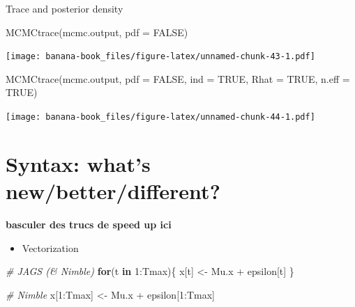 \documentclass[
  12pt,
]{krantz}
\newenvironment{Shaded}{\begin{snugshade}}{\end{snugshade}}
\newcommand{\AttributeTok}[1]{\textcolor[rgb]{0.77,0.63,0.00}{#1}}
\newcommand{\CommentTok}[1]{\textcolor[rgb]{0.56,0.35,0.01}{\textit{#1}}}
\newcommand{\ConstantTok}[1]{\textcolor[rgb]{0.00,0.00,0.00}{#1}}
\newcommand{\ControlFlowTok}[1]{\textcolor[rgb]{0.13,0.29,0.53}{\textbf{#1}}}
\newcommand{\DecValTok}[1]{\textcolor[rgb]{0.00,0.00,0.81}{#1}}
\newcommand{\FunctionTok}[1]{\textcolor[rgb]{0.00,0.00,0.00}{#1}}
\newcommand{\NormalTok}[1]{#1}
\newcommand{\OtherTok}[1]{\textcolor[rgb]{0.56,0.35,0.01}{#1}}
\newcommand{\SpecialCharTok}[1]{\textcolor[rgb]{0.00,0.00,0.00}{#1}}
\providecommand{\tightlist}{%
  \setlength{\itemsep}{0pt}\setlength{\parskip}{0pt}}
\begin{document}
Trace and posterior density

\begin{Shaded}
\begin{Highlighting}[]
\FunctionTok{MCMCtrace}\NormalTok{(mcmc.output,}
          \AttributeTok{pdf =} \ConstantTok{FALSE}\NormalTok{)}
\end{Highlighting}
\end{Shaded}

\texttt{[image: banana-book\_files/figure-latex/unnamed-chunk-43-1.pdf]}

\begin{Shaded}
\begin{Highlighting}[]
\FunctionTok{MCMCtrace}\NormalTok{(mcmc.output,}
          \AttributeTok{pdf =} \ConstantTok{FALSE}\NormalTok{,}
          \AttributeTok{ind =} \ConstantTok{TRUE}\NormalTok{,}
          \AttributeTok{Rhat =} \ConstantTok{TRUE}\NormalTok{,}
          \AttributeTok{n.eff =} \ConstantTok{TRUE}\NormalTok{)}
\end{Highlighting}
\end{Shaded}

\texttt{[image: banana-book\_files/figure-latex/unnamed-chunk-44-1.pdf]}

\hypertarget{syntax-whats-newbetterdifferent}{%
\section{Syntax: what's new/better/different?}\label{syntax-whats-newbetterdifferent}}

\textbf{basculer des trucs de speed up ici}

\begin{itemize}
\tightlist
\item
  Vectorization
\end{itemize}

\begin{Shaded}
\begin{Highlighting}[]
\CommentTok{\# JAGS (\& Nimble)}
\ControlFlowTok{for}\NormalTok{(t }\ControlFlowTok{in} \DecValTok{1}\SpecialCharTok{:}\NormalTok{Tmax)\{}
\NormalTok{  x[t] }\OtherTok{\textless{}{-}}\NormalTok{ Mu.x }\SpecialCharTok{+}\NormalTok{ epsilon[t]}
\NormalTok{\}}

\CommentTok{\# Nimble}
\NormalTok{x[}\DecValTok{1}\SpecialCharTok{:}\NormalTok{Tmax] }\OtherTok{\textless{}{-}}\NormalTok{ Mu.x }\SpecialCharTok{+}\NormalTok{ epsilon[}\DecValTok{1}\SpecialCharTok{:}\NormalTok{Tmax]}
\end{Highlighting}
\end{Shaded}
\end{document}
